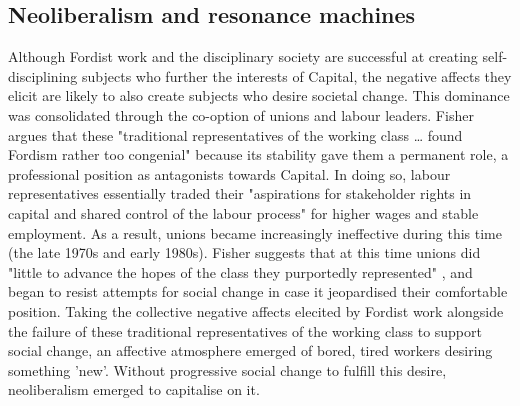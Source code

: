 
\subsection{Neoliberalism and resonance machines}
\label{neoliberalism-and-resonance-machines}

Although Fordist work and the disciplinary society are successful at creating self-disciplining subjects who further the interests of Capital, the negative affects they elicit are likely to also create subjects who desire societal change. This dominance was consolidated through the co-option of unions and labour leaders. Fisher argues that these "traditional representatives of the working class \ldots{} found Fordism rather too congenial" \citep[38]{fisher_capitalist_2009} because its stability gave them a permanent role, a professional position as antagonists towards Capital. In doing so, labour representatives essentially traded their "aspirations for stakeholder rights in capital and shared control of the labour process"  \citep[37]{ANTONION AND BONANNO 2000} for higher wages and stable employment. As a result, unions became increasingly ineffective during this time (the late 1970s and early 1980s). Fisher suggests that at this time unions did "little to advance the hopes of the class they purportedly represented" \citep[38]{fisher_capitalist_2009}, and began to resist attempts for social change in case it jeopardised their comfortable position. Taking the collective negative affects elecited by Fordist work alongside the failure of these traditional representatives of the working class to support social change, an affective atmosphere emerged of bored, tired workers desiring something 'new'. Without progressive social change to fulfill this desire, neoliberalism emerged to capitalise on it.

